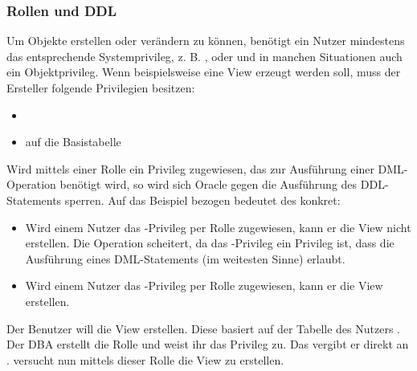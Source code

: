         \subsubsection{Rollen und DDL}
          \label{rolesandddl}
          Um Objekte erstellen oder verändern zu können, benötigt ein Nutzer mindestens das entsprechende Systemprivileg, z. B. ,  oder  und in manchen Situationen auch ein Objektprivileg. Wenn beispielsweise eine View erzeugt werden soll, muss der Ersteller folgende Privilegien besitzen:
          \begin{itemize}
            \item {}
            \item {} auf die Basistabelle
          \end{itemize}
          Wird mittels einer Rolle ein Privileg zugewiesen, das zur Ausführung einer DML-Operation benötigt wird, so wird sich Oracle gegen die Ausführung des DDL-Statements sperren. Auf das Beispiel bezogen bedeutet des konkret:
          \begin{itemize}
            \item Wird einem Nutzer das -Privileg per Rolle zugewiesen, kann er die View nicht erstellen. Die Operation scheitert, da das -Privileg ein Privileg ist, dass die Ausführung eines DML-Statements (im weitesten Sinne) erlaubt.
            \item Wird einem Nutzer das -Privileg per Rolle zugewiesen, kann er die View erstellen.
          \end{itemize}
          Der Benutzer  will die View  erstellen. Diese basiert auf der Tabelle  des Nutzers . Der DBA erstellt die Rolle  und weist ihr das Privileg  zu. Das  vergibt er direkt an .  versucht nun mittels dieser Rolle die View zu erstellen.

